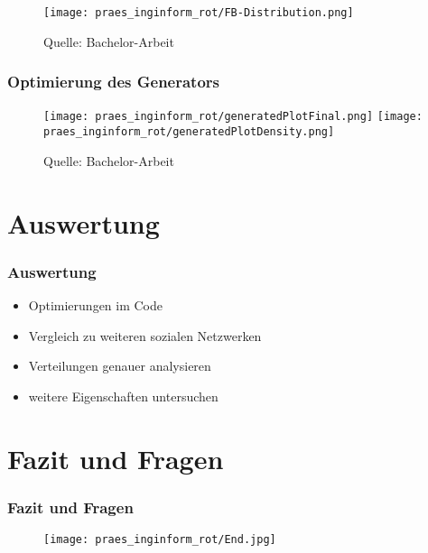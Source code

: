 \documentclass[notes=show]{beamer}
\begin{document}
\begin{frame}
\vspace{-2.6cm}
\vspace{2.5cm}
  \begin{figure}
  \hspace{4cm}
  \texttt{[image: praes\_inginform\_rot/FB-Distribution.png]}
  \caption{Quelle: Bachelor-Arbeit}
  \label{fig:distributionALL}
\end{figure}
\end{frame}

\begin{frame}
  \frametitle{Optimierung des Generators}
\vspace{-2.6cm}
\vspace{2.5cm}
  \begin{figure}
  \hspace{4cm}
  \texttt{[image: praes\_inginform\_rot/generatedPlotFinal.png]}
  \texttt{[image: praes\_inginform\_rot/generatedPlotDensity.png]}
  \caption{Quelle: Bachelor-Arbeit}
  \label{fig:distributionALL}
\end{figure}
\end{frame}



\section{Auswertung}
\begin{frame}
  \frametitle{Auswertung}
\begin{itemize}
    \item Optimierungen im Code
    \item Vergleich zu weiteren sozialen Netzwerken
    \item Verteilungen genauer analysieren
    \item weitere Eigenschaften untersuchen

\end{itemize}
\vspace{-1.6cm}
\vspace{2.0cm}
\end{frame}


\section{Fazit und Fragen}
\begin{frame}
  \frametitle{Fazit und Fragen}
\vspace{-2.6cm}
\vspace{2.5cm}
  \begin{figure}
  \hspace{4cm}
  \texttt{[image: praes\_inginform\_rot/End.jpg]}
  \label{fig:distributionALL}
\end{figure}

\end{frame}
\end{document}
